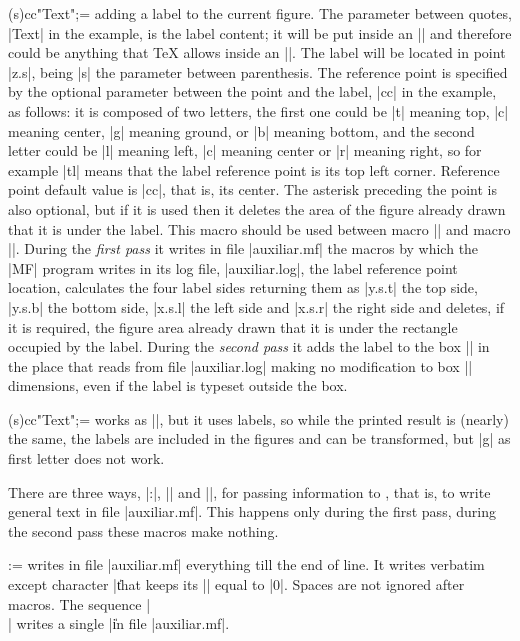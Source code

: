 \macro\MTlabel*(s)cc"Text";= adding a label to the current figure.
The parameter between quotes, |Text| in the example, is the label
content; it will be put inside an |\hbox| and therefore could be
anything that {\TeX} allows inside an |\hbox|.  The label will be
located in {\MF} point |z.s|, being |s| the parameter between
parenthesis.  The reference point is specified by the optional
parameter between the point and the label, |cc| in the example, as
follows:  it is composed of two letters, the first one could be |t|
meaning top, |c| meaning center, |g| meaning ground, or |b| meaning
bottom, and the second letter could be |l| meaning left, |c| meaning
center or |r| meaning right, so for example |tl| means that the
label reference point is its top left corner.  Reference point
default value is |cc|, that is, its center.
The asterisk preceding the point is also optional, but if it is used
then it deletes the area of the figure already drawn that it is under
the label.  This macro should be used between macro |\MTbeginchar|
and macro |\MTendchar|.  During the {\it first pass\/} it writes in
file |auxiliar.mf| the {\MF} macros by which the |MF| program writes
in its log file, |auxiliar.log|, the label reference point location,
calculates the four label sides returning them as |y.s.t| the top
side, |y.s.b| the bottom side, |x.s.l| the left side and |x.s.r| the
right side and deletes, if it is required, the figure area already
drawn that it is under the rectangle occupied by the label.  During
the {\it second pass\/} it adds the label to the box |\MTbox| in the
place that reads from file |auxiliar.log| making no modification to
box |\MTbox| dimensions, even if the label is typeset outside the
box.

\macro\MPlabel*(s)cc"Text";= works as |\MTlabel|, but it uses {\MP}
labels, so while the printed result is (nearly) the same,
the labels are included in the figures and can be transformed,
but |g| as first letter does not work.

\smallskip

There are three ways, |\MT:|, |\MTcode| and |\MTline|, for passing
information to \MF, that is, to write general text in
file |auxiliar.mf|.  This happens only during the first pass, during
the second pass these macros make nothing.

\macro\MT:= writes in file |auxiliar.mf| everything till the end of
line.  It writes verbatim except character |\| that keeps its
|\catcode| equal to |0|.  Spaces are not ignored after macros.  The
sequence |\\| writes a single |\| in file |auxiliar.mf|.

